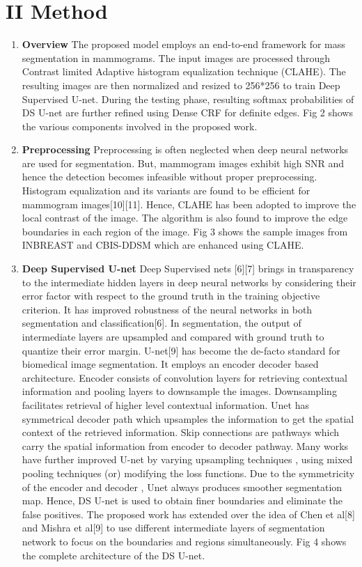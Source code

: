 \documentclass[review]{elsarticle}
\newcommand{\<}{${<}$}
\begin{document}
\section{II Method }
\begin{enumerate}
\item \textbf {Overview} 
The proposed model employs an end-to-end framework for mass segmentation in mammograms.  The input images are processed through Contrast limited Adaptive histogram equalization technique (CLAHE).  The resulting images are then normalized and resized to 256*256 to train Deep Supervised U-net. During the testing phase, resulting softmax probabilities of DS U-net are further refined using Dense CRF for  definite edges. Fig 2 shows the various components involved in the proposed work.

\item \textbf {Preprocessing} \newline
Preprocessing is often neglected when deep neural networks are used for segmentation. But, mammogram images exhibit high SNR and hence the detection becomes infeasible without proper preprocessing. Histogram equalization and its variants are found to be efficient for mammogram images[10][11]. Hence, CLAHE has been adopted to improve the local contrast of the image. The algorithm is also found to improve the edge boundaries in each region of the image. Fig 3 shows the sample images from INBREAST and CBIS-DDSM which are enhanced using CLAHE.

\item \textbf {Deep Supervised U-net} \newline
Deep Supervised nets [6][7] brings in transparency to the intermediate hidden layers in deep neural networks by considering their error factor with respect to the ground truth in the training objective criterion. It has improved robustness of the neural networks in both segmentation and classification[6]. In segmentation, the output of intermediate layers are upsampled and compared with ground truth to quantize their error margin.  U-net[9] has become the de-facto standard for biomedical image segmentation. It employs an encoder decoder based architecture. Encoder consists of convolution layers for retrieving contextual information and pooling layers to downsample the images. Downsampling facilitates retrieval of higher level contextual information. Unet has symmetrical decoder path which upsamples the information to get the spatial context of the retrieved information. Skip connections are pathways which carry the spatial information from encoder to decoder pathway. Many works have further improved U-net by varying upsampling techniques , using mixed pooling techniques (or) modifying the loss functions. Due to the symmetricity of the encoder and decoder , Unet always produces smoother segmentation map. Hence, DS U-net is used to obtain finer boundaries and eliminate the false positives. The proposed work has extended over the idea of Chen et al[8] and Mishra et al[9] to use different intermediate layers of segmentation network to focus on the boundaries and regions simultaneously. Fig 4 shows the complete architecture of the DS U-net.


\end{enumerate}
\end{document}
